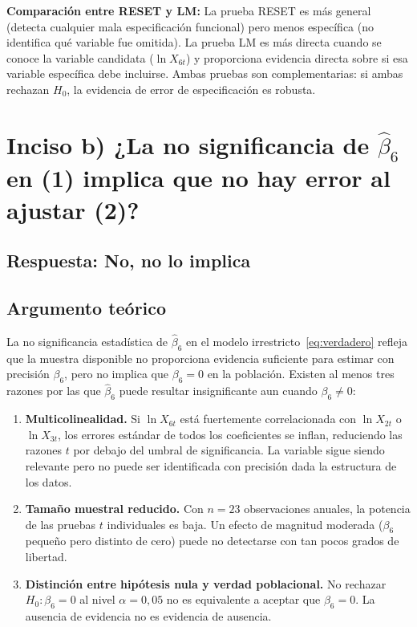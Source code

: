 \documentclass[12pt, letterpaper]{article}
\begin{document}
\begin{clave}
  \textbf{Comparación entre RESET y LM:} La prueba RESET es más general
  (detecta cualquier mala especificación funcional) pero menos específica
  (no identifica qué variable fue omitida). La prueba LM es más directa
  cuando se conoce la variable candidata ($\ln X_{6t}$) y proporciona
  evidencia directa sobre si esa variable específica debe incluirse.
  Ambas pruebas son complementarias: si ambas rechazan $H_0$, la
  evidencia de error de especificación es robusta.
\end{clave}

\section{Inciso b) ¿La no significancia de $\hat{\beta}_6$ en (1) implica
         que no hay error al ajustar (2)?}

\subsection*{Respuesta: No, no lo implica}

\subsection{Argumento teórico}

La no significancia estadística de $\hat{\beta}_6$ en el modelo
irrestricto~\eqref{eq:verdadero} refleja que la muestra disponible no
proporciona evidencia suficiente para estimar con precisión $\beta_6$,
pero no implica que $\beta_6 = 0$ en la población. Existen al menos
tres razones por las que $\hat{\beta}_6$ puede resultar insignificante
aun cuando $\beta_6 \neq 0$:

\begin{enumerate}[leftmargin=1.8cm, label=\textbf{\arabic*.}]

  \item \textbf{Multicolinealidad.} Si $\ln X_{6t}$ está fuertemente
    correlacionada con $\ln X_{2t}$ o $\ln X_{3t}$, los errores estándar
    de todos los coeficientes se inflan, reduciendo las razones $t$ por
    debajo del umbral de significancia. La variable sigue siendo relevante
    pero no puede ser identificada con precisión dada la estructura de
    los datos.

  \item \textbf{Tamaño muestral reducido.} Con $n = 23$ observaciones
    anuales, la potencia de las pruebas $t$ individuales es baja.
    Un efecto de magnitud moderada ($\beta_6$ pequeño pero distinto de
    cero) puede no detectarse con tan pocos grados de libertad.

  \item \textbf{Distinción entre hipótesis nula y verdad poblacional.}
    No rechazar $H_0: \beta_6 = 0$ al nivel $\alpha = 0{,}05$ no es
    equivalente a aceptar que $\beta_6 = 0$. La ausencia de evidencia
    no es evidencia de ausencia.

\end{enumerate}
\end{document}
